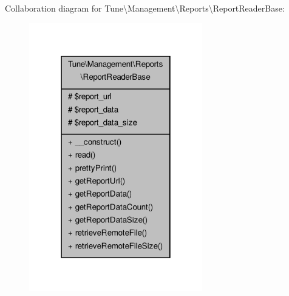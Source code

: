 Collaboration diagram for Tune\textbackslash{}Management\textbackslash{}Reports\textbackslash{}Report\-Reader\-Base\-:
\nopagebreak
\begin{figure}[H]
\begin{center}
\leavevmode
\includegraphics[width=214pt]{classTune_1_1Management_1_1Reports_1_1ReportReaderBase__coll__graph}
\end{center}
\end{figure}

